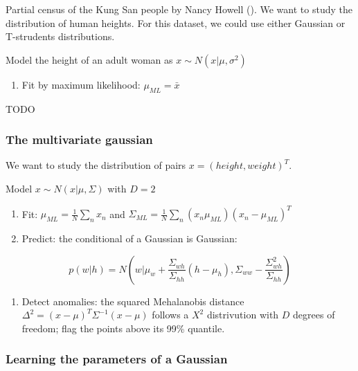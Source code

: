 \documentclass{article}
\begin{document}
Partial census of the Kung San people by Nancy Howell
().
We want to study the distribution of human heights. For this dataset, we
could use either Gaussian or T-strudents distributions.

Model the height of an adult woman as \(x \sim N(x | \mu, \sigma^2)\)

\begin{enumerate}
\def\labelenumi{\arabic{enumi}.}
\tightlist
\item
  Fit by maximum likelihood: \(\mu_{ML} = \bar{x}\)
\end{enumerate}

TODO

\subsubsection{The multivariate
gaussian}\label{the-multivariate-gaussian}

We want to study the distribution of pairs \(x = (height, weight)^T\).

Model \(x \sim N (x | \mu, \Sigma )\) with \(D=2\)

\begin{enumerate}
\def\labelenumi{\arabic{enumi}.}
\item
  Fit: \(\mu_{ML} = \frac{1}{N} \sum_n x_n\) and
  \(\Sigma_{ML} = \frac{1}{N}\sum_n
  (x_n \mu_{ML}) (x_n - \mu_{ML})^T\)
\item
  Predict: the conditional of a Gaussian is Gaussian:
\end{enumerate}

\[p(w | h) = N (w | \mu_w + \frac{\Sigma_{wh}}{\Sigma_{hh}}(h - \mu_h ),
\Sigma_{ww} - \frac{\Sigma^2_{wh}}{\Sigma_{hh}})\]

\begin{enumerate}
\def\labelenumi{\arabic{enumi}.}
\setcounter{enumi}{2}
\tightlist
\item
  Detect anomalies: the squared Mehalanobis distance
  \(\Delta^2 = (x - \mu)^T
  \Sigma^{-1} (x - \mu)\) follows a \(X^2\) distrivution with \(D\)
  degrees of freedom; flag the points above its 99\% quantile.
\end{enumerate}

\subsubsection{Learning the parameters of a
Gaussian}\label{learning-the-parameters-of-a-gaussian-1}
\end{document}
